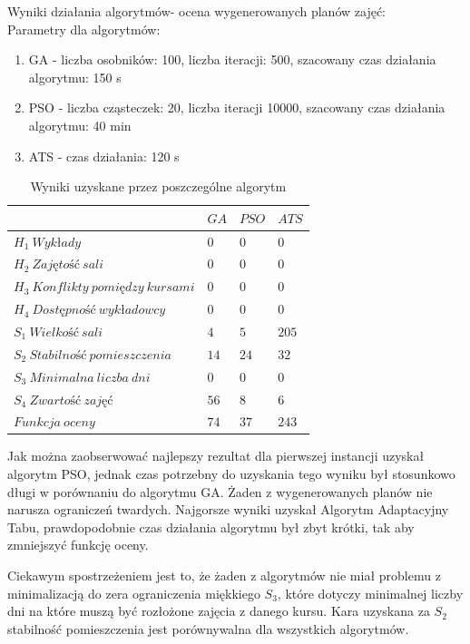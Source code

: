 \par Wyniki działania algorytmów- ocena wygenerowanych planów zajęć: \\
Parametry dla algorytmów:
\begin{enumerate}
\item GA - liczba osobników: 100, liczba iteracji: 500, szacowany czas działania algorytmu: 150 s
\item PSO - liczba cząsteczek: 20, liczba iteracji 10000, szacowany czas działania algorytmu: 40 min
\item ATS - czas działania: 120 s
\end{enumerate}
\begin{table}[H]
\begin{center}

\begin{tabular}{ |l|l|l|l| }
\hline
 & $GA$ & $PSO$ & $ATS$\\
\hline
${H}_{1}\ Wykłady$ & $0$ & $0$ & $0$\\
\hline
$H_{2}\ Zajętość\ sali$ & $0$ & $0$ & $0$\\
\hline
$H_{3}\ Konflikty\ pomiędzy\ kursami$ & $0$ & $0$ & $0$ \\
\hline
$H_{4}\ Dostępność\ wykładowcy$ & $0$ & $0$ & $0$ \\
\hline
$S_{1}\ Wielkość\ sali$ & $4$ & $5$ & $205$ \\
\hline
$S_{2}\ Stabilność\ pomieszczenia$ & $14$ & $24$ & $32$ \\
\hline
$S_{3}\ Minimalna\ liczba\ dni$ & $0$ & $0$ & $0$ \\
\hline
$S_{4}\ Zwartość\ zajęć$ & $56$ & $8$ & $6$ \\
\hline
$Funkcja\ oceny$ & $74$ & $37$ & $243$ \\
\hline
\end{tabular}
\end{center}
\caption {Wyniki uzyskane przez poszczególne algorytm}
\end{table}
\par Jak można zaobserwować najlepszy rezultat dla pierwszej instancji uzyskał algorytm PSO, jednak czas potrzebny do uzyskania tego wyniku był stosunkowo długi w porównaniu do algorytmu GA. Żaden z wygenerowanych planów nie narusza ograniczeń twardych. Najgorsze wyniki uzyskał Algorytm Adaptacyjny Tabu, prawdopodobnie czas działania algorytmu był zbyt krótki, tak aby zmniejszyć funkcję oceny.
\par Ciekawym spostrzeżeniem jest to, że żaden z algorytmów nie miał problemu z minimalizacją do zera ograniczenia miękkiego $S_{3}$, które dotyczy minimalnej liczby dni na które muszą być rozłożone zajęcia z danego kursu. Kara uzyskana za $S_{2}$ stabilność pomieszczenia jest porównywalna dla wszystkich algorytmów.
